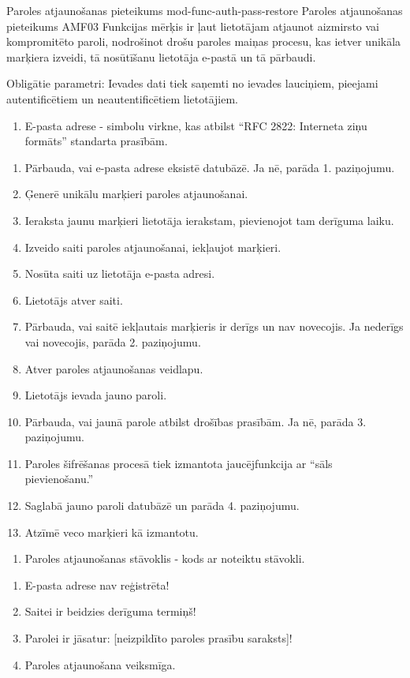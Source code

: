 \moduleFunctionTable
{Paroles atjaunošanas pieteikums}
{mod-func-auth-pass-restore}
{Paroles atjaunošanas pieteikums}
{AMF03}
{
	Funkcijas mērķis ir ļaut lietotājam atjaunot aizmirsto vai kompromitēto paroli, nodrošinot drošu paroles maiņas procesu, kas ietver unikāla marķiera izveidi, tā nosūtīšanu lietotāja e-pastā un tā pārbaudi.
}
{
	Obligātie parametri:
	Ievades dati tiek saņemti no ievades lauciņiem, pieejami autentificētiem un neautentificētiem lietotājiem.
	\begin{enumerate}
		\item E-pasta adrese - simbolu virkne, kas atbilst ``RFC 2822: Interneta ziņu formāts'' standarta prasībām.
	\end{enumerate}
}
{
	\begin{enumerate}
		\item Pārbauda, vai e-pasta adrese eksistē datubāzē.
		      Ja nē, parāda 1. paziņojumu.
		\item Ģenerē unikālu marķieri paroles atjaunošanai.
		\item Ieraksta jaunu marķieri lietotāja ierakstam, pievienojot tam derīguma laiku.
		\item Izveido saiti paroles atjaunošanai, iekļaujot marķieri.
		\item Nosūta saiti uz lietotāja e-pasta adresi.
		\item Lietotājs atver saiti.
		\item Pārbauda, vai saitē iekļautais marķieris ir derīgs un nav novecojis.
		      Ja nederīgs vai novecojis, parāda 2. paziņojumu.
		\item Atver paroles atjaunošanas veidlapu.
		\item Lietotājs ievada jauno paroli.
		\item Pārbauda, vai jaunā parole atbilst drošības prasībām.
		      Ja nē, parāda 3. paziņojumu.
		\item Paroles šifrēšanas procesā tiek izmantota jaucējfunkcija ar ``sāls pievienošanu.''
		\item Saglabā jauno paroli datubāzē un parāda 4. paziņojumu.
		\item Atzīmē veco marķieri kā izmantotu.
	\end{enumerate}
}
{
	\begin{enumerate}
		\item Paroles atjaunošanas stāvoklis - kods ar noteiktu stāvokli.
	\end{enumerate}

}
{
	\begin{enumerate}
		\item E-pasta adrese nav reģistrēta!
		\item Saitei ir beidzies derīguma termiņš!
		\item Parolei ir jāsatur: [neizpildīto paroles prasību saraksts]!
		\item Paroles atjaunošana veiksmīga.
	\end{enumerate}
}
